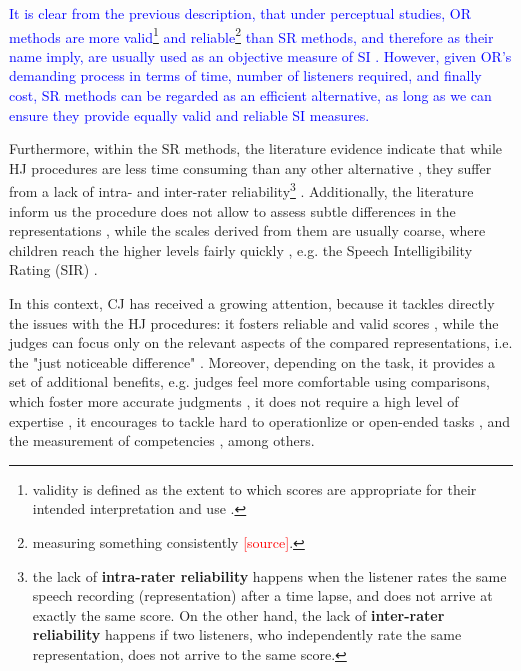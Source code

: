 \textcolor{blue}{ It is clear from the previous description, that under perceptual studies, OR methods are more valid\footnote{validity is defined as the extent to which scores are appropriate for their intended interpretation and use \citep{Lesterhuis_2018}.} and reliable\footnote{measuring something consistently \textcolor{red}{[source]}.} than SR methods, and therefore as their name imply, are usually used as an objective measure of SI \citep{Boonen_et_al_2021, Faes_et_al_2021}. However, given OR's demanding process in terms of time, number of listeners required, and finally cost, SR methods can be regarded as an efficient alternative, as long as we can ensure they provide equally valid and reliable SI measures. }

Furthermore, within the SR methods, the literature evidence indicate that while HJ procedures are less time consuming than any other alternative \citep{Boonen_et_al_2021}, they suffer from a lack of intra- and inter-rater reliability\footnote{the lack of \textbf{intra-rater reliability} happens when the listener rates the same speech recording (representation) after a time lapse, and does not arrive at exactly the same score. On the other hand, the lack of \textbf{inter-rater reliability} happens if two listeners, who independently rate the same representation, does not arrive to the same score.} \citep{McLeod_et_al_2012, Johannisson_et_al_2014, Hustad_et_al_2020, Boonen_et_al_2021}. Additionally, the literature inform us the procedure does not allow to assess subtle differences in the representations \citep{Boonen_et_al_2021}, while the scales derived from them are usually coarse, where children reach the higher levels fairly quickly \citep{DeRaeve_2010}, e.g. the Speech Intelligibility Rating (SIR) \citep{Cox_et_al_1989, McDaniel_et_al_1992}.

In this context, CJ has received a growing attention, because it tackles directly the issues with the HJ procedures: it fosters reliable \citep{Verhavert_et_al_2019} and valid scores \citep{Bramley_2008, Lesterhuis_2018}, while the judges can focus only on the relevant aspects of the compared representations, i.e. the "just noticeable difference" \citep{Lesterhuis_2018}. Moreover, depending on the task, it provides a set of additional benefits, e.g. judges feel more comfortable using comparisons, which foster more accurate judgments \citep{Gill_et_al_2013}, it does not require a high level of expertise \citep{Lesterhuis_2018, Boonen_et_al_2020}, it encourages to tackle hard to operationlize or open-ended tasks \citep{Pollitt_2012a, Pollitt_2012b, Lesterhuis_2018}, and the measurement of competencies \citep{Verhavert_2018}, among others.
